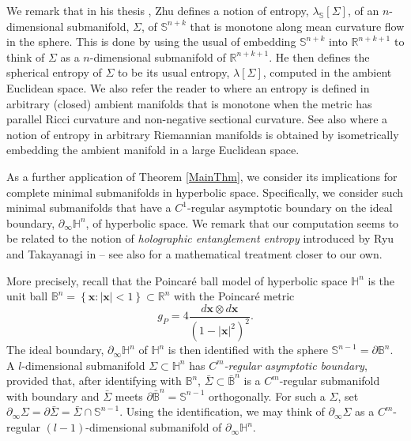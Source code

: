 \documentclass{amsart}
\theoremstyle{definition}
\theoremstyle{remark}
\numberwithin{equation}{section}
\newcommand{\set}[1]{\left\{#1\right\}}
\newcommand{\Real}{\mathbb R}
\begin{document}
We remark that in his thesis \cite{zhuGeometricVariationalProblems2018}, Zhu defines a notion of entropy, $\lambda_{\mathbb{S}}[\Sigma]$, of an $n$-dimensional submanifold, $\Sigma$, of $\mathbb{S}^{n+k}$ that is monotone along mean curvature flow in the sphere.  This is done by using the usual of embedding $\mathbb{S}^{n+k}$ into $\mathbb{R}^{n+k+1}$ to think of $\Sigma$ as a $n$-dimensional submanifold of $\Real^{n+k+1}$. He then defines the spherical entropy of $\Sigma$ to be its usual entropy, $\lambda[\Sigma]$, computed in the ambient Euclidean space.  We also refer the reader to \cite{sunEntropyClosedManifold2019} where an entropy is defined in arbitrary (closed) ambient manifolds that is monotone when the metric has parallel Ricci curvature and non-negative sectional curvature.  See also \cite{mramorEntropyGenericMean2018} where a notion of entropy in arbitrary Riemannian manifolds is obtained by isometrically embedding the ambient manifold in a large Euclidean space.
	

As a further application of Theorem \ref{MainThm}, we consider its implications for complete minimal submanifolds in hyperbolic space.  Specifically, we consider such minimal submanifolds that have a $C^1$-regular asymptotic boundary on the ideal boundary, $\partial_\infty \mathbb{H}^n$, of hyperbolic space. We remark that our computation seems to be related to the notion of \emph{holographic entanglement entropy} introduced by Ryu and Takayanagi in \cite{Ryu2006, Ryu2006a} -- see also \cite{Alexakis, Alexakis2010} for a mathematical treatment closer to our own. 

More precisely, recall that the Poincar\'{e} ball model of hyperbolic space $\mathbb{H}^n$ is the unit ball $\mathbb{B}^n=\set{\mathbf{x}: |\mathbf{x}|<1}\subset \Real^n$ with the Poincar\'{e} metric
$$
g_P=4\frac{ d\mathbf{x}\otimes d\mathbf{x}}{(1-|\mathbf{x}|^2)^2}.
$$
The ideal boundary,  $\partial_\infty \mathbb{H}^{n}$ of $\mathbb{H}^{n}$ is then identified with the sphere $\mathbb{S}^{n-1}=\partial \mathbb{B}^n$.   A $l$-dimensional submanifold $\Sigma\subset \mathbb{H}^{n}$ has \emph{$C^m$-regular asymptotic boundary}, provided that, after identifying with $\mathbb{B}^n$,  $\bar{\Sigma}\subset \bar{\mathbb{B}}^n$ is a $C^m$-regular submanifold with boundary and $\bar{\Sigma}$ meets $\partial\bar{\mathbb{B}}^n=\mathbb{S}^{n-1}$ orthogonally.  For such a $\Sigma$, set $\partial_\infty \Sigma=\partial \bar{\Sigma}=\bar{\Sigma}\cap  \mathbb{S}^{n-1}$.  Using the identification, we may think of $\partial_\infty \Sigma $ as a $C^m$-regular $(l-1)$-dimensional submanifold of $\partial_\infty \mathbb{H}^n$.  
\end{document}
